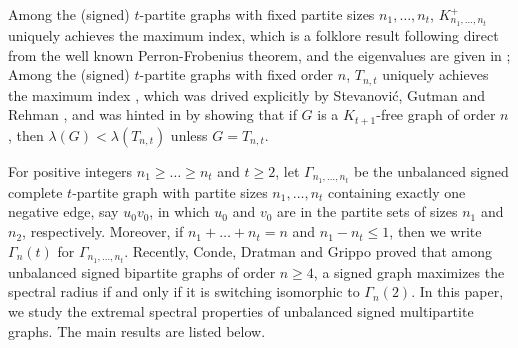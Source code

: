 \documentclass[12pt]{article}
\numberwithin{equation}{section}
\begin{document}

 

 



Among the (signed) $t$-partite graphs with fixed partite sizes $n_1,\dots, n_t$, $K_{n_1, \dots, n_t}^+$ uniquely achieves the maximum index, which is a folklore result following direct from the well known Perron-Frobenius theorem, and the eigenvalues are given in \cite{De, EH}; Among the (signed) $t$-partite graphs with fixed order $n$, $T_{n,t}$ uniquely achieves the maximum index , which was drived explicitly  by Stevanovi\'c,   Gutman and Rehman \cite{SGR}, and was hinted in \cite{Ni} by showing that  if $G$ is a $K_{t+1}$-free graph of order $n$, then $\lambda(G)<\lambda(T_{n,t})$ unless $G=T_{n,t}$.



For positive integers $n_1\ge \dots \ge n_t$ and $t\ge 2$, let $\Gamma_{n_1, \dots, n_t}$  be the unbalanced signed complete  $t$-partite graph with partite sizes $n_1, \dots, n_t$  containing exactly one negative edge, say $u_0v_0$, in which $u_0$ and $v_0$ are in the partite sets of sizes $n_1$ and $n_2$, respectively. Moreover, if   $n_1+\dots+n_t=n$ and $n_1-n_t\le1$, then we write $\Gamma_n(t)$ for
 $\Gamma_{n_1, \dots, n_t}$. 
Recently, Conde, Dratman and Grippo \cite{CDG} proved that among
 unbalanced signed bipartite graphs of order $n \ge 4$, a signed graph maximizes the spectral radius if and only if it is switching isomorphic to $\Gamma_n(2)$.  In this paper, we study the extremal spectral properties of unbalanced signed multipartite graphs. The main results are listed below. 

%




\end{document}
